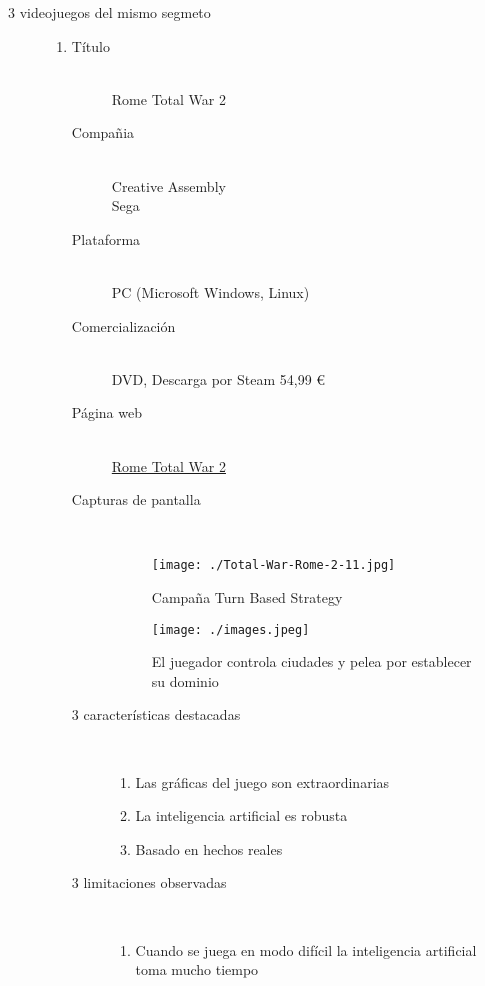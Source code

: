 \documentclass[a4paper]{article}
\begin{document}
\begin{description}
  \item[3 videojuegos del mismo segmeto]
    \begin{enumerate}
      \item
      \begin{description}
        \item[Título] \hfill \\
        Rome Total War 2
        \item[Compañia] \hfill \\
        Creative Assembly \\Sega
        \item[Plataforma] \hfill \\
        PC (Microsoft Windows, Linux)
        \item[Comercialización] \hfill \\
        DVD, Descarga por Steam 54,99 \euro{}
        \item[Página web] \hfill \\
        \hyperlink{http://www.totalwar.com/en_us/rome2/}{Rome Total War 2}
        \item[Capturas de pantalla] \hfill \\
        \begin{figure}[ht!]
        \centering
        \texttt{[image: ./Total-War-Rome-2-11.jpg]}
        \caption{Campaña Turn Based Strategy}
        \label{overflow}
        \end{figure}
        \begin{figure}[ht!]
        \centering
        \texttt{[image: ./images.jpeg]}
        \caption{El juegador controla ciudades y pelea por establecer su dominio}
        \label{overflow2}
        \end{figure}
        \item[3 características destacadas] \hfill \\
          \begin{enumerate}
            \item Las gráficas del juego son extraordinarias
            \item La inteligencia artificial es robusta
            \item Basado en hechos reales
          \end{enumerate}
        \item[3 limitaciones observadas] \hfill \\
          \begin{enumerate}
            \item Cuando se juega en modo difícil la inteligencia artificial toma mucho tiempo

\end{enumerate}
\end{description}
\end{enumerate}
\end{description}
\end{document}
